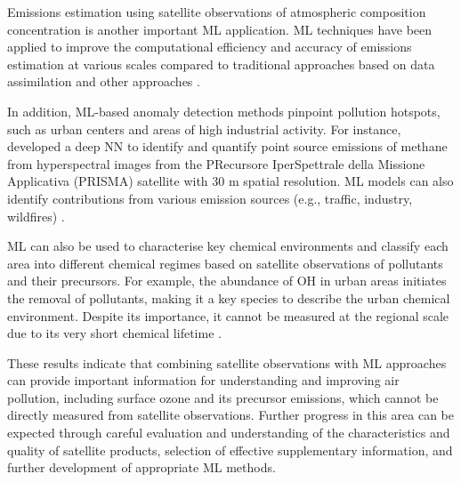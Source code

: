 \documentclass[gmd, manuscript]{copernicus}
\begin{document}
Emissions estimation using satellite observations of atmospheric composition concentration is another important ML application. ML techniques have been applied to improve the computational efficiency and accuracy of emissions estimation at various scales compared to traditional approaches based on data assimilation and other approaches \citep{dadheech_high-resolution_2024, xing_rapid_2022, tu_estimation_2023, li_emission-based_2024, bruno_u-plume_2024}. 

In addition, ML-based anomaly detection methods pinpoint pollution hotspots, such as urban centers and areas of high industrial activity. For instance, \citet{joyce_using_2023} developed a deep NN to identify and quantify point source emissions of methane from hyperspectral images from the PRecursore IperSpettrale della Missione Applicativa (PRISMA) satellite with 30 m spatial resolution. ML models can also identify contributions from various emission sources (e.g., traffic, industry, wildfires) \citep{kang_mitigating_2024, finch_automated_2022, kurchaba_anomalous_2023, rollend_machine_2023}. 

ML can also be used to characterise key chemical environments and classify each area into different chemical regimes based on satellite observations of pollutants and their precursors. For example, the abundance of OH in urban areas initiates the removal of pollutants, making it a key species to describe the urban chemical environment. Despite its importance, it cannot be measured at the regional scale due to its very short chemical lifetime \citep{duncan_opinion_2024}. 


These results indicate that combining satellite observations with ML approaches can provide important information for understanding and improving air pollution, including surface ozone and its precursor emissions, which cannot be directly measured from satellite observations. Further progress in this area can be expected through careful evaluation and understanding of the characteristics and quality of satellite products, selection of effective supplementary information, and further development of appropriate ML methods.
\end{document}
